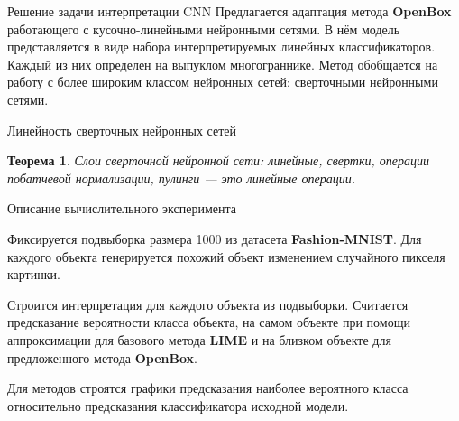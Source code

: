 \documentclass{beamer}
\begin{document}
\begin{frame}{Решение задачи интерпретации CNN}
Предлагается адаптация метода \textbf{OpenBox} работающего с  кусочно-линейными нейронными сетями. В нём модель представляется в виде набора интерпретируемых линейных классификаторов. Каждый из них определен на выпуклом многограннике. Метод обобщается на работу с более широким классом нейронных сетей: сверточными нейронными сетями.
\end{frame}
\begin{frame}{Линейность сверточных нейронных сетей}
\newtheorem{hypothesis}{Теорема}
\begin{hypothesis}
Слои сверточной нейронной сети: линейные, свертки, операции побатчевой нормализации, пулинги --- это линейные операции.
\end{hypothesis}

\end{frame}
\begin{frame}{Описание вычислительного эксперимента}

Фиксируется подвыборка размера 1000 из датасета \textbf{Fashion-MNIST}. Для каждого объекта генерируется похожий объект изменением случайного пикселя картинки.
\bigskip

Строится интерпретация для каждого объекта из подвыборки. Считается предсказание вероятности класса объекта, на самом объекте при помощи аппроксимации для базового метода \textbf{LIME} и на близком объекте для предложенного метода \textbf{OpenBox}.
\bigskip

Для методов строятся графики предсказания наиболее вероятного класса относительно предсказания классификатора исходной модели.
\end{frame}
\end{document}
